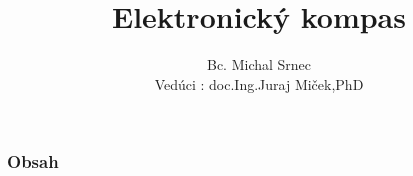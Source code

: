 \documentclass[green,xcolor=table,svgnames,hyperref={pdfpagelabels=false},slidestop,usepdftitle=false]{beamer}
\title{Elektronický kompas}
\author[Bc. Michal Srnec]{Bc. Michal Srnec\\Vedúci : doc.Ing.Juraj Miček,PhD}
\institute{Žilinská Univerzita v Žiline\\ Fakulta riadenia a informatiky}
\begin{document}
\begin{frame}
  \titlepage
\end{frame}
\begin{frame}
  \frametitle{Obsah}
  \tableofcontents
\end{frame}








\end{document}
